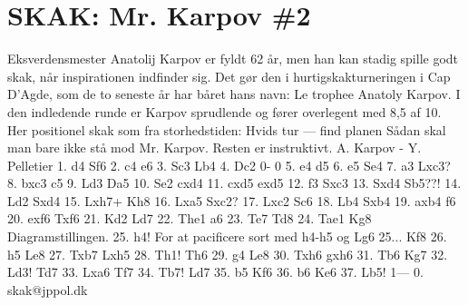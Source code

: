 \section{SKAK: Mr. Karpov \#2}
\label{JPPOLSencondHighestMatch2}
Eksverdensmester Anatolij Karpov er fyldt 62 år, men han kan stadig spille godt skak, når inspirationen indfinder sig. Det gør den i hurtigskakturneringen i Cap D'Agde, som de to seneste år har båret hans navn: Le trophee Anatoly Karpov. I den indledende runde er Karpov sprudlende og fører overlegent med 8,5 af 10. Her positionel skak som fra storhedstiden: Hvids tur — find planen Sådan skal man bare ikke stå mod Mr. Karpov. Resten er instruktivt. A. Karpov - Y. Pelletier 1. d4 Sf6 2. c4 e6 3. Sc3 Lb4 4. Dc2 0- 0 5. e4 d5 6. e5 Se4 7. a3 Lxc3? 8. bxc3 c5 9. Ld3 Da5 10. Se2 cxd4 11. cxd5 exd5 12. f3 Sxc3 13. Sxd4 Sb5??! 14. Ld2 Sxd4 15. Lxh7+ Kh8 16. Lxa5 Sxc2? 17. Lxc2 Sc6 18. Lb4 Sxb4 19. axb4 f6 20. exf6 Txf6 21. Kd2 Ld7 22. The1 a6 23. Te7 Td8 24. Tae1 Kg8 Diagramstillingen. 25. h4! For at pacificere sort med h4-h5 og Lg6 25... Kf8 26. h5 Le8 27. Txb7 Lxh5 28. Th1! Th6 29. g4 Le8 30. Txh6 gxh6 31. Tb6 Kg7 32. Ld3! Td7 33. Lxa6 Tf7 34. Tb7! Ld7 35. b5 Kf6 36. b6 Ke6 37. Lb5! 1— 0. skak@jppol.dk

